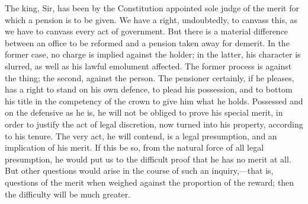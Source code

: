 The king, Sir, has been by the Constitution appointed sole judge of the merit for which a pension is to be given. We have a right, undoubtedly, to canvass this, as we have to canvass every act of government. But there is a material difference between an office to be reformed and a pension taken away for demerit. In the former case, no charge is implied against the holder; in the latter, his character is slurred, as well as his lawful emolument affected. The former process is against the thing; the second, against the person. The pensioner certainly, if he pleases, has a right to stand on his own defence, to plead his possession, and to bottom his title in the competency of the crown to give him what he holds. Possessed and on the defensive as he is, he will not be obliged to prove his special merit, in order to justify the act of legal discretion, now turned into his property, according to his tenure. The very act, he will contend, is a legal presumption, and an implication of his merit. If this be so, from the natural force of all legal presumption, he would put us to the difficult proof that he has no merit at all. But other questions would arise in the course of such an inquiry,—that is, questions of the merit when weighed against the proportion of the reward; then the difficulty will be much greater.

